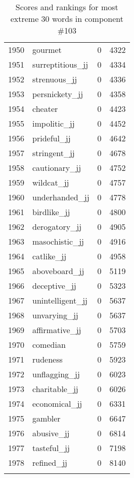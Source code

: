 \begin{longtable}[!htbp]{| rlr@{.}l |}
    1950 & gourmet & 0 & 4322 \\
    1951 & surreptitious\_jj & 0 & 4334 \\
    1952 & strenuous\_jj & 0 & 4336 \\
    1953 & persnickety\_jj & 0 & 4358 \\
    1954 & cheater & 0 & 4423 \\
    1955 & impolitic\_jj & 0 & 4452 \\
    1956 & prideful\_jj & 0 & 4642 \\
    1957 & stringent\_jj & 0 & 4678 \\
    1958 & cautionary\_jj & 0 & 4752 \\
    1959 & wildcat\_jj & 0 & 4757 \\
    1960 & underhanded\_jj & 0 & 4778 \\
    1961 & birdlike\_jj & 0 & 4800 \\
    1962 & derogatory\_jj & 0 & 4905 \\
    1963 & masochistic\_jj & 0 & 4916 \\
    1964 & catlike\_jj & 0 & 4958 \\
    1965 & aboveboard\_jj & 0 & 5119 \\
    1966 & deceptive\_jj & 0 & 5323 \\
    1967 & unintelligent\_jj & 0 & 5637 \\
    1968 & unvarying\_jj & 0 & 5637 \\
    1969 & affirmative\_jj & 0 & 5703 \\
    1970 & comedian & 0 & 5759 \\
    1971 & rudeness & 0 & 5923 \\
    1972 & unflagging\_jj & 0 & 6023 \\
    1973 & charitable\_jj & 0 & 6026 \\
    1974 & economical\_jj & 0 & 6331 \\
    1975 & gambler & 0 & 6647 \\
    1976 & abusive\_jj & 0 & 6814 \\
    1977 & tasteful\_jj & 0 & 7198 \\
    1978 & refined\_jj & 0 & 8140 \\
    \hline
    \caption{Scores and rankings for most extreme 30 words in component \#103} \\
\end{longtable}
